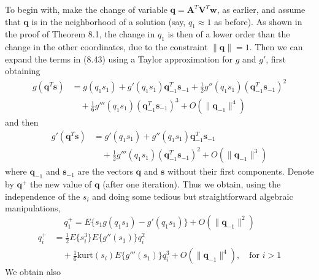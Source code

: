 \documentclass[12pt,a4paper,twoside,openany]{book}
\begin{document}
\begin{appendices}
    To begin with, make the change of variable $\mathbf{q} = \mathbf{A}^T \mathbf{V}^T \mathbf{w}$, as earlier, and assume that $\mathbf{q}$ is in the neighborhood of a solution (say, $q_1 \approx 1$ as before). As shown in the proof of Theorem 8.1, the change in $q_1$ is then of a lower order than the change in the other coordinates, due to the constraint $\|\mathbf{q}\| = 1$. Then we can expand the terms in (8.43) using a Taylor approximation for $g$ and $g'$, first obtaining
    \begin{equation}
    \begin{aligned}
        g(\mathbf{q}^T \mathbf{s}) &= g(q_1 s_1) + g'(q_1 s_1)\mathbf{q}_{-1}^T \mathbf{s}_{-1} + \frac{1}{2} g''(q_1 s_1)(\mathbf{q}_{-1}^T \mathbf{s}_{-1})^2 \\
        &\quad + \frac{1}{6} g'''(q_1 s_1)(\mathbf{q}_{-1}^T \mathbf{s}_{-1})^3 + O(\|\mathbf{q}_{-1}\|^4)
    \end{aligned} \tag{A.6}
    \end{equation}
    and then
    \begin{equation}
    \begin{aligned}
        g'(\mathbf{q}^T \mathbf{s}) &= g'(q_1 s_1) + g''(q_1 s_1)\mathbf{q}_{-1}^T \mathbf{s}_{-1} \\
        &\quad + \frac{1}{2} g'''(q_1 s_1)(\mathbf{q}_{-1}^T \mathbf{s}_{-1})^2 + O(\|\mathbf{q}_{-1}\|^3)
    \end{aligned} \tag{A.7}
    \end{equation}
    where $\mathbf{q}_{-1}$ and $\mathbf{s}_{-1}$ are the vectors $\mathbf{q}$ and $\mathbf{s}$ without their first components. Denote by $\mathbf{q}^+$ the new value of $\mathbf{q}$ (after one iteration). Thus we obtain, using the independence of the $s_i$ and doing some tedious but straightforward algebraic manipulations,
    \begin{equation}
        q_1^+ = E\{s_1 g(q_1 s_1) - g'(q_1 s_1)\} + O(\|\mathbf{q}_{-1}\|^2) \tag{A.8}
    \end{equation}
    \begin{equation}
    \begin{aligned}
        q_i^+ &= \frac{1}{2} E\{s_i^3\} E\{g''(s_1)\} q_i^2 \\
        &\quad + \frac{1}{6} \text{kurt}(s_i) E\{g'''(s_1)\} q_i^3 + O(\|\mathbf{q}_{-1}\|^4), \quad \text{for } i > 1
    \end{aligned} \tag{A.9}
    \end{equation}
    We obtain also
    \begin{equation}

\end{equation}
\end{appendices}
\end{document}

